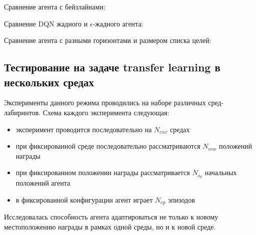 \documentclass[a4paper]{article}
\begin{document}
Сравнение агента с бейзлайнами:


Сравнение DQN жадного и $\epsilon$-жадного агента:


Сравнение агента с разными горизонтами и размером списка целей:

  

  

  

\subsection{Тестирование на задаче transfer learning в нескольких средах}

Эксперименты данного режима проводились на наборе различных сред-лабиринтов. Схема каждого эксперимента следующая:

\begin{itemize}
  \item эксперимент проводится последовательно на $N_{env}$ средах
  \item при фиксированной среде последовательно рассматриваются $N_{rew}$ положений награды
  \item при фиксированном положении награды рассматривается $N_{s_0}$ начальных положений агента
  \item в фиксированной конфигурации агент играет $N_{ep}$ эпизодов
\end{itemize}

Исследовалась способность агента адаптироваться не только к новому местоположению награды в рамках одной среды, но и к новой среде.
\end{document}
